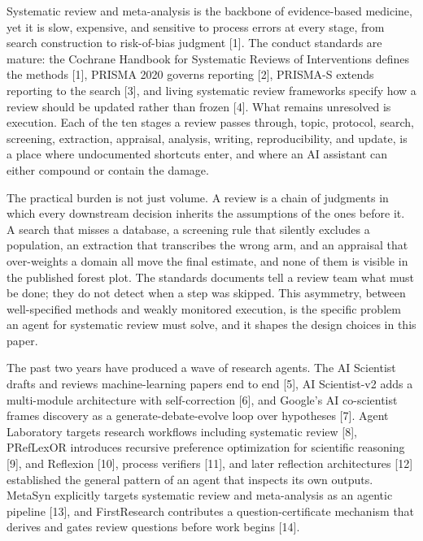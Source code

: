 \documentclass[
]{article}
\newcounter{none} %
\begin{document}
Systematic review and meta-analysis is the backbone of evidence-based
medicine, yet it is slow, expensive, and sensitive to process errors at
every stage, from search construction to risk-of-bias judgment {[}1{]}.
The conduct standards are mature: the Cochrane Handbook for Systematic
Reviews of Interventions defines the methods {[}1{]}, PRISMA 2020
governs reporting {[}2{]}, PRISMA-S extends reporting to the search
{[}3{]}, and living systematic review frameworks specify how a review
should be updated rather than frozen {[}4{]}. What remains unresolved is
execution. Each of the ten stages a review passes through, topic,
protocol, search, screening, extraction, appraisal, analysis, writing,
reproducibility, and update, is a place where undocumented shortcuts
enter, and where an AI assistant can either compound or contain the
damage.

The practical burden is not just volume. A review is a chain of
judgments in which every downstream decision inherits the assumptions of
the ones before it. A search that misses a database, a screening rule
that silently excludes a population, an extraction that transcribes the
wrong arm, and an appraisal that over-weights a domain all move the
final estimate, and none of them is visible in the published forest
plot. The standards documents tell a review team what must be done; they
do not detect when a step was skipped. This asymmetry, between
well-specified methods and weakly monitored execution, is the specific
problem an agent for systematic review must solve, and it shapes the
design choices in this paper.

The past two years have produced a wave of research agents. The AI
Scientist drafts and reviews machine-learning papers end to end {[}5{]},
AI Scientist-v2 adds a multi-module architecture with self-correction
{[}6{]}, and Google's AI co-scientist frames discovery as a
generate-debate-evolve loop over hypotheses {[}7{]}. Agent Laboratory
targets research workflows including systematic review {[}8{]},
PRefLexOR introduces recursive preference optimization for scientific
reasoning {[}9{]}, and Reflexion {[}10{]}, process verifiers {[}11{]},
and later reflection architectures {[}12{]} established the general
pattern of an agent that inspects its own outputs. MetaSyn explicitly
targets systematic review and meta-analysis as an agentic pipeline
{[}13{]}, and FirstResearch contributes a question-certificate mechanism
that derives and gates review questions before work begins {[}14{]}.
\end{document}
